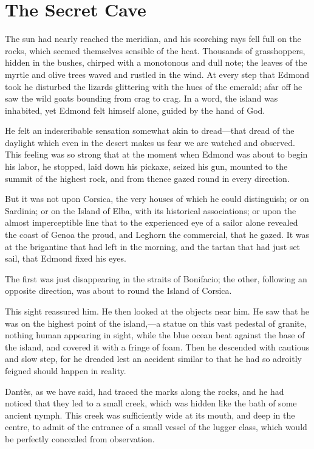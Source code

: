 \chapter{The Secret Cave}

The sun had nearly reached the meridian, and his scorching rays fell
full on the rocks, which seemed themselves sensible of the heat.
Thousands of grasshoppers, hidden in the bushes, chirped with a
monotonous and dull note; the leaves of the myrtle and olive trees
waved and rustled in the wind. At every step that Edmond took he
disturbed the lizards glittering with the hues of the emerald; afar off
he saw the wild goats bounding from crag to crag. In a word, the island
was inhabited, yet Edmond felt himself alone, guided by the hand of
God.

He felt an indescribable sensation somewhat akin to dread—that dread of
the daylight which even in the desert makes us fear we are watched and
observed. This feeling was so strong that at the moment when Edmond was
about to begin his labor, he stopped, laid down his pickaxe, seized his
gun, mounted to the summit of the highest rock, and from thence gazed
round in every direction.

But it was not upon Corsica, the very houses of which he could
distinguish; or on Sardinia; or on the Island of Elba, with its
historical associations; or upon the almost imperceptible line that to
the experienced eye of a sailor alone revealed the coast of Genoa the
proud, and Leghorn the commercial, that he gazed. It was at the
brigantine that had left in the morning, and the tartan that had just
set sail, that Edmond fixed his eyes.

The first was just disappearing in the straits of Bonifacio; the other,
following an opposite direction, was about to round the Island of
Corsica.

This sight reassured him. He then looked at the objects near him. He
saw that he was on the highest point of the island,—a statue on this
vast pedestal of granite, nothing human appearing in sight, while the
blue ocean beat against the base of the island, and covered it with a
fringe of foam. Then he descended with cautious and slow step, for he
dreaded lest an accident similar to that he had so adroitly feigned
should happen in reality.

Dantès, as we have said, had traced the marks along the rocks, and he
had noticed that they led to a small creek, which was hidden like the
bath of some ancient nymph. This creek was sufficiently wide at its
mouth, and deep in the centre, to admit of the entrance of a small
vessel of the lugger class, which would be perfectly concealed from
observation.

